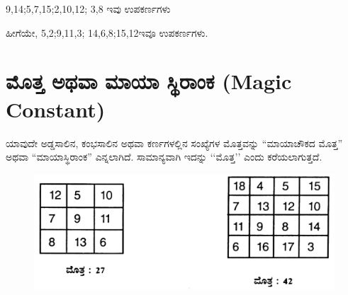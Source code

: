 9,14;5,7,15;2,10,12; 3,8 ಇವು ಉಪಕರ್ಣಗಳು

ಹೀಗೆಯೇ, 5,2;9,11,3; 14,6,8;15,12ಇವೂ ಉಪಕರ್ಣಗಳು.

\section*{ಮೊತ್ತ ಅಥವಾ ಮಾಯಾ ಸ್ಥಿರಾಂಕ (Magic Constant)}

ಯಾವುದೇ ಅಡ್ಡಸಾಲಿನ, ಕಂಭಸಾಲಿನ ಅಥವಾ ಕರ್ಣಗಳಲ್ಲಿನ ಸಂಖ್ಯೆಗಳ ಮೊತ್ತವನ್ನು \break“ಮಾಯಾಚೌಕದ ಮೊತ್ತ” ಅಥವಾ “ಮಾಯಾಸ್ಥಿರಾಂಕ” ಎನ್ನಲಾಗಿದೆ. ಸಾಮಾನ್ಯವಾಗಿ \break ಇದನ್ನು ‘‘ಮೊತ್ತ’’ ಎಂದು ಕರೆಯಲಾಗುತ್ತದೆ.
\begin{figure}[H]
\includegraphics[scale=1.1]{src/figures/chap2/fig2-5.jpg}
\end{figure}
